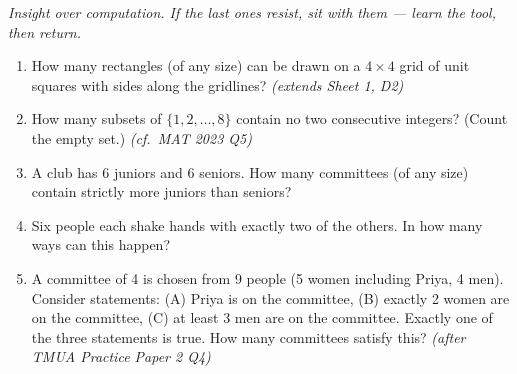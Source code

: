 \documentclass[11pt,a4paper]{article}
\begin{document}
\noindent\textit{Insight over computation. If the last ones resist, sit with them --- learn the tool, then return.}

\begin{enumerate}

\item How many rectangles (of any size) can be drawn on a $4\times4$ grid of unit squares with sides along the gridlines? \textit{\small(extends Sheet 1, D2)}

\item How many subsets of $\{1,2,\ldots,8\}$ contain no two consecutive integers? (Count the empty set.) \textit{\small(cf.\ MAT 2023 Q5)}

\item A club has 6 juniors and 6 seniors. How many committees (of any size) contain strictly more juniors than seniors?

\item Six people each shake hands with exactly two of the others. In how many ways can this happen?

\item A committee of 4 is chosen from 9 people (5 women including Priya, 4 men). Consider statements: (A) Priya is on the committee, (B) exactly 2 women are on the committee, (C) at least 3 men are on the committee. Exactly one of the three statements is true. How many committees satisfy this? \textit{\small(after TMUA Practice Paper 2 Q4)}

\end{enumerate}

\end{document}
